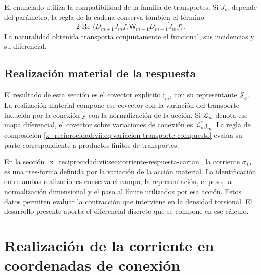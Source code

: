 El enunciado utiliza la compatibilidad de la familia de transportes.
Si \(J_m\) depende del parámetro, la regla de la cadena conserva
también el término
\[
 2\operatorname{Re}
 \langle D_{m+1}J_mf,\mathsf W_{m+1}D_{m+1}\dot J_mf\rangle.
\]
La naturalidad obtenida transporta conjuntamente el funcional, sus
incidencias y su diferencial.

\section{Realización material de la respuesta}
\label{x_reciprocidad:vii:subsec:realizacion-respuesta-discreta}

El resultado de esta sección es el covector explícito
\(\mathfrak j_m\), con su representante \(\mathcal J_a\).
La realización material compone ese covector con la variación del
transporte inducida por la conexión y con la normalización de la acción.
Si \(\mathcal L_m\) denota ese mapa diferencial, el covector sobre
variaciones de conexión es \(\mathcal L_m^*\mathfrak j_m\).
La regla de composición
\eqref{x_reciprocidad:vii:eq:variacion-transporte-compuesto} evalúa su parte
correspondiente a productos finitos de transportes.

En la sección~\ref{x_reciprocidad:vii:sec:corriente-respuesta-cartan}, la corriente
\(\sigma_{IJ}\) es una tres-forma definida por la variación de la acción
material. La identificación entre ambas realizaciones conserva el campo,
la representación, el peso, la normalización dimensional y el paso al
límite utilizados por esa acción. Estos datos permiten evaluar la
contracción que interviene en la densidad torsional. El desarrollo
presente aporta el diferencial discreto que se compone en ese cálculo.




\chapter{Realización de la corriente en coordenadas de conexión}
\label{x_reciprocidad:vii:sec:composicion-corriente-conexion}

